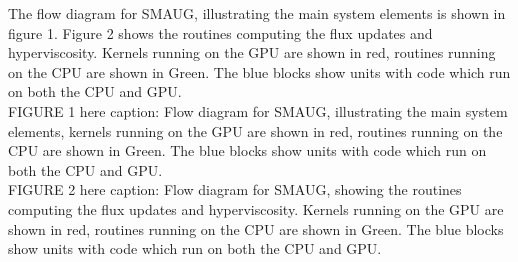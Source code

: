 \documentclass[final,1p]{elsarticle}
\begin{document}
The flow diagram for SMAUG,  illustrating the main system elements is shown in figure 1. Figure 2  shows the routines computing the flux updates and hyperviscosity. Kernels running on the GPU are shown in red, routines running on the CPU are shown in Green. The blue blocks show units with code which run on both the CPU and GPU.\\



FIGURE 1 here caption:  Flow diagram for SMAUG,  illustrating the main system elements, kernels running on the GPU are shown in red, routines running on the CPU are shown in Green. The blue blocks show units with code which run on both the CPU and GPU.\\





FIGURE 2 here caption:  Flow diagram for SMAUG,  showing the routines computing the flux updates and hyperviscosity. Kernels running on the GPU are shown in red, routines running on the CPU are shown in Green. The blue blocks show units with code which run on both the CPU and GPU.\\


\end{document}
